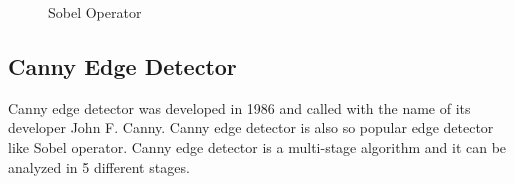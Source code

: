 \begin{figure}[H]
  \centering
  \hfill
  \caption{Sobel Operator\cite{Sobel_Operator}}
\end{figure} 


%
\subsection{Canny Edge Detector}\label{sec:Canny Edge Detector}

Canny edge detector was developed in 1986 and called with the name of its developer John F. Canny. Canny edge detector is also so popular edge detector like Sobel operator. Canny edge detector is a multi-stage algorithm and it can be analyzed in 5 different stages.\cite{Canny_Edge_Detector2}

